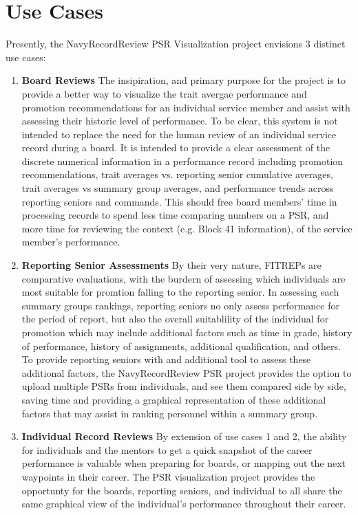 \documentclass[UTF8]{article}
\begin{document}
\section{Use Cases}
Presently, the NavyRecordReview PSR Visualization project envisions 3 distinct use cases:
\begin{enumerate}
\item \textbf{Board Reviews} The insipiration, and primary purpose for the project is to provide a better way to visualize the trait avergae performance and promotion recommendations for an individual service member and assist with assessing their historic level of performance. To be clear, this system is not intended to replace the need for the human review of an individual service record during a board. It is intended to provide a clear assessment of the discrete numerical information in a performance record including promotion recommendations, trait averages vs. reporting senior cumulative averages, trait averages vs summary group averages, and performance trends across reporting seniors and commands. This should free board members' time in processing records to spend less time comparing numbers on a PSR, and more time for reviewing the context (e.g. Block 41 information), of the service member's performance.
\item \textbf{Reporting Senior Assessments} By their very nature, FITREPs are comparative evaluations, with the burdern of assessing which individuals are most suitable for promtion falling to the reporting senior. In assessing each summary groups rankings, reporting seniors no only assess performance for the period of report, but also the overall suitablility of the individual for promotion which may include additional factors such as time in grade, history of performance, history of assignments, additional qualification, and others. To provide reporting seniors with and additional tool to assess these additional factors, the NavyRecordReview PSR project provides the option to upload multiple PSRs from individuals, and see them compared side by side, saving time and providing a graphical representation of these additional factors that may assist in ranking personnel within a summary group.
\item \textbf{Individual Record Reviews} By extension of use cases 1 and 2, the ability for individuals and the mentors to get a quick snapshot of the career performance is valuable when preparing for boards, or mapping out the next waypoints in their career. The PSR visualization project provides the opportunty for the boards, reporting seniors, and individual to all share the same graphical view of the individual's performance throughout their career.
\end{enumerate}
\end{document}
